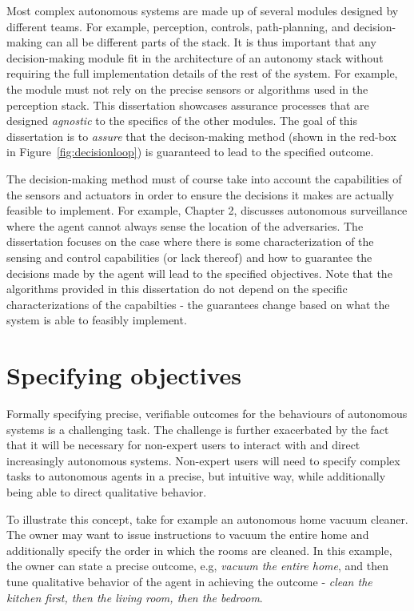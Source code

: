 Most complex autonomous systems are made up of several modules designed by different teams. For example, perception, controls, path-planning, and decision-making can all be different parts of the stack. It is thus important that any decision-making module fit in the architecture of an autonomy stack without requiring the full implementation details of the rest of the system. For example, the module must not rely on the precise sensors or algorithms used in the perception stack. This dissertation showcases assurance processes that are designed \emph{agnostic} to the specifics of the other modules. The goal of this dissertation is to \emph{assure} that the decison-making method (shown in the red-box in Figure~\ref{fig:decisionloop}) is guaranteed to lead to the specified outcome.  

The decision-making method must of course take into account the capabilities of the sensors and actuators in order to ensure the decisions it makes are actually feasible to implement. For example, Chapter 2, discusses autonomous surveillance where the agent cannot always sense the location of the adversaries. The dissertation focuses on the case where there is some characterization of the sensing and control capabilities (or lack thereof) and how to guarantee the decisions made by the agent will lead to the specified objectives. Note that the algorithms provided in this dissertation do not depend on the specific characterizations of the capabilties - the guarantees change based on what the system is able to feasibly implement. 

\section{Specifying objectives}

Formally specifying precise, verifiable outcomes for the behaviours of autonomous systems is a challenging task. The challenge is further exacerbated by the fact that it will be necessary for non-expert users to interact with and direct increasingly autonomous systems. Non-expert users will need to specify complex tasks to autonomous agents in a precise, but intuitive way, while additionally being able to direct qualitative behavior. 

To illustrate this concept, take for example an autonomous home vacuum cleaner. The owner may want to issue instructions to vacuum the entire home and additionally specify the order in which the rooms are cleaned. In this example, the owner can state a precise outcome, e.g, \emph{vacuum the entire home}, and then tune qualitative behavior of the agent in achieving the outcome - \emph{clean the kitchen first, then the living room, then the bedroom}. 

